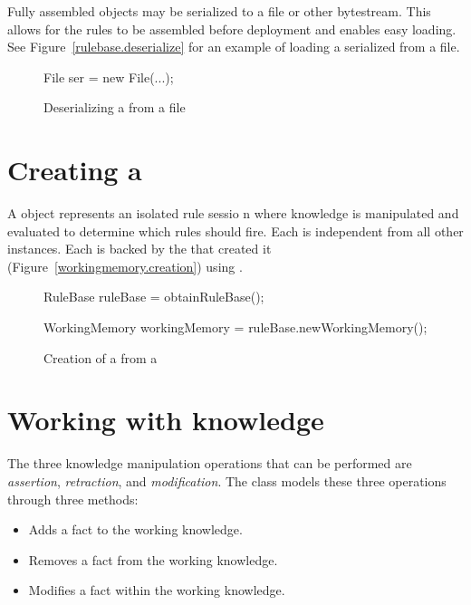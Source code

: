 Fully assembled  objects may be serialized to a
file or other bytestream.  This allows for the rules to be assembled
before deployment and enables easy loading.  See
Figure~\vref{rulebase.deserialize} for an example of loading a
serialized  from a file.

\begin{figure}
\begin{javaCodelisting}
File ser = new File(...);
\end{javaCodelisting}
\caption{Deserializing a  from a file}
\label{rulebase.deserialize}
\end{figure}

\section{Creating a }

A  object represents an isolated rule
sessio n where knowledge is manipulated and evaluated to determine
which rules should fire.  Each  is independent
from all other instances. Each  is backed by the
 that created it
(Figure~\vref{workingmemory.creation}) using
.

\begin{figure}
\begin{javaCodelisting}
RuleBase ruleBase = obtainRuleBase();

WorkingMemory workingMemory = ruleBase.newWorkingMemory();
\end{javaCodelisting}
\caption{Creation of a  from a
}
\label{workingmemory.creation}
\end{figure}

\section{Working with knowledge}

The three knowledge manipulation operations that can be performed
are \emph{assertion},
\emph{retraction}, and
\emph{modification}.  The
 class models these three operations
through three methods:

\begin{itemize}
  \item {} Adds a fact to 
    the working knowledge.
  \item {} Removes a fact
    from the working knowledge.
  \item {} Modifies a
    fact within the working knowledge.
\end{itemize}

